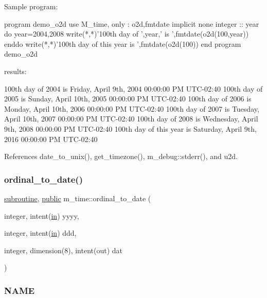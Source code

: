 \begin{DoxyVerb}
\begin{DoxyVerb}Sample program:

 program demo_o2d
 use M_time, only : o2d,fmtdate
 implicit none
 integer :: year
    do year=2004,2008
       write(*,*)'100th day of ',year,' is ',fmtdate(o2d(100,year))
    enddo
    write(*,*)'100th day of this year is ',fmtdate(o2d(100))
 end program demo_o2d

results:

 100th day of 2004 is Friday, April 9th, 2004 00:00:00 PM UTC-02:40
 100th day of 2005 is Sunday, April 10th, 2005 00:00:00 PM UTC-02:40
 100th day of 2006 is Monday, April 10th, 2006 00:00:00 PM UTC-02:40
 100th day of 2007 is Tuesday, April 10th, 2007 00:00:00 PM UTC-02:40
 100th day of 2008 is Wednesday, April 9th, 2008 00:00:00 PM UTC-02:40
 100th day of this year is Saturday, April 9th, 2016 00:00:00 PM UTC-02:40 \end{DoxyVerb}
 

References date\+\_\+to\+\_\+unix(), get\+\_\+timezone(), m\+\_\+debug\+::stderr(), and u2d.

\mbox{\label{namespacem__time_aa4dca4409bf20a011bb04988c1335d63}} 
\subsubsection{\texorpdfstring{ordinal\+\_\+to\+\_\+date()}{ordinal\_to\_date()}}
{\footnotesize\ttfamily \hyperlink{M__stopwatch_83_8txt_acfbcff50169d691ff02d4a123ed70482}{subroutine}, \hyperlink{M__stopwatch_83_8txt_a2f74811300c361e53b430611a7d1769f}{public} m\+\_\+time\+::ordinal\+\_\+to\+\_\+date (\begin{DoxyParamCaption}\item[{integer, intent(\hyperlink{M__journal_83_8txt_afce72651d1eed785a2132bee863b2f38}{in})}]{yyyy,  }\item[{integer, intent(\hyperlink{M__journal_83_8txt_afce72651d1eed785a2132bee863b2f38}{in})}]{ddd,  }\item[{integer, dimension(8), intent(out)}]{dat }\end{DoxyParamCaption})}



\subsubsection*{N\+A\+ME}


\end{DoxyVerb}
